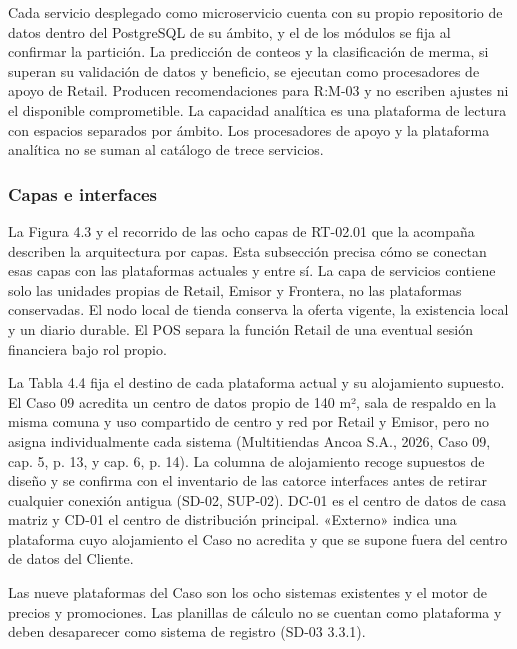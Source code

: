 \documentclass[11pt]{article}
\begin{document}
Cada servicio desplegado como microservicio cuenta con su propio repositorio de datos dentro del PostgreSQL de su ámbito, y el de los módulos se fija al confirmar la partición. La predicción de conteos y la clasificación de merma, si superan su validación de datos y beneficio, se ejecutan como procesadores de apoyo de Retail. Producen recomendaciones para R:M-03 y no escriben ajustes ni el disponible comprometible. La capacidad analítica es una plataforma de lectura con espacios separados por ámbito. Los procesadores de apoyo y la plataforma analítica no se suman al catálogo de trece servicios.

\subsubsection{Capas e interfaces}

La Figura 4.3 y el recorrido de las ocho capas de RT-02.01 que la acompaña describen la arquitectura por capas. Esta subsección precisa cómo se conectan esas capas con las plataformas actuales y entre sí. La capa de servicios contiene solo las unidades propias de Retail, Emisor y Frontera, no las plataformas conservadas. El nodo local de tienda conserva la oferta vigente, la existencia local y un diario durable. El POS separa la función Retail de una eventual sesión financiera bajo rol propio.

La Tabla 4.4 fija el destino de cada plataforma actual y su alojamiento supuesto. El Caso 09 acredita un centro de datos propio de 140 m², sala de respaldo en la misma comuna y uso compartido de centro y red por Retail y Emisor, pero no asigna individualmente cada sistema (Multitiendas Ancoa S.A., 2026, Caso 09, cap. 5, p. 13, y cap. 6, p. 14). La columna de alojamiento recoge supuestos de diseño y se confirma con el inventario de las catorce interfaces antes de retirar cualquier conexión antigua (SD-02, SUP-02). DC-01 es el centro de datos de casa matriz y CD-01 el centro de distribución principal. «Externo» indica una plataforma cuyo alojamiento el Caso no acredita y que se supone fuera del centro de datos del Cliente.

Las nueve plataformas del Caso son los ocho sistemas existentes y el motor de precios y promociones. Las planillas de cálculo no se cuentan como plataforma y deben desaparecer como sistema de registro (SD-03 3.3.1).

\par\vspace{0pt plus 10\baselineskip}\vspace{0pt plus -10\baselineskip}
\end{document}
